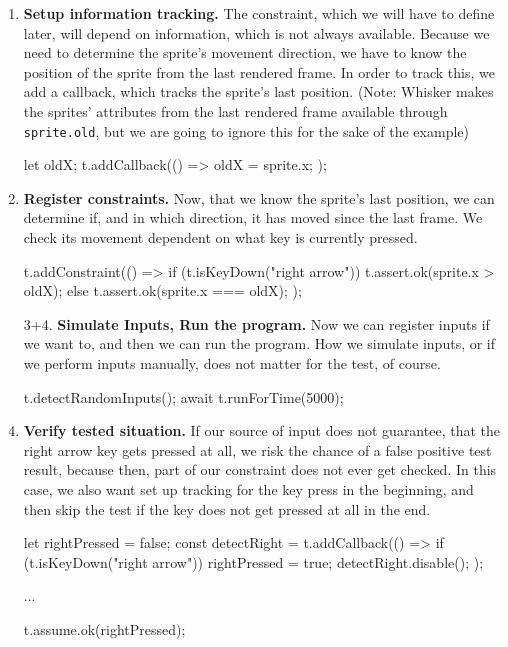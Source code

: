 \begin{enumerate}
    \item \textbf{Setup information tracking.}
        The constraint, which we will have to define later, will depend on information, which is not always available.
        Because we need to determine the sprite's movement direction, we have to know the position of the sprite from the last rendered frame.
        In order to track this, we add a callback, which tracks the sprite's last position.
        (Note: Whisker makes the sprites' attributes from the last rendered frame available through \texttt{sprite.old}, but we are going to ignore this for the sake of the example)
        \begin{javascriptcode}
            let oldX;
            t.addCallback(() => {
                oldX = sprite.x;
            });
        \end{javascriptcode}
    \item \textbf{Register constraints.}
        Now, that we know the sprite's last position, we can determine if, and in which direction, it has moved since the last frame.
        We check its movement dependent on what key is currently pressed.
        \begin{javascriptcode}
            t.addConstraint(() => {
                if (t.isKeyDown("right arrow")) {
                    t.assert.ok(sprite.x > oldX);
                } else {
                    t.assert.ok(sprite.x === oldX);
                }
            });
        \end{javascriptcode}
    \item[3+4.] \textbf{Simulate Inputs, Run the program.}
        \setcounter{enumi}{4}
        Now we can register inputs if we want to, and then we can run the program.
        How we simulate inputs, or if we perform inputs manually, does not matter for the test, of course.
        \begin{javascriptcode}
            t.detectRandomInputs();
            await t.runForTime(5000);
        \end{javascriptcode}
    \item \textbf{Verify tested situation.}
        If our source of input does not guarantee, that the right arrow key gets pressed at all, we risk the chance of a false positive test result,
        because then, part of our constraint does not ever get checked.
        In this case, we also want set up tracking for the key press in the beginning,
        and then skip the test if the key does not get pressed at all in the end.
        \begin{javascriptcode}
            let rightPressed = false;
            const detectRight = t.addCallback(() => {
                if (t.isKeyDown("right arrow")) {
                    rightPressed = true;
                    detectRight.disable();
                }
            });

            ...

            t.assume.ok(rightPressed);
        \end{javascriptcode}
\end{enumerate}

